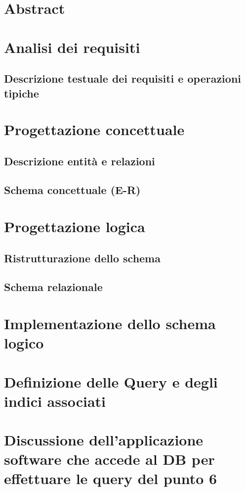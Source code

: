 \documentclass{article}
\begin{document}
\section{Abstract}
\section{Analisi dei requisiti}
\subsection{Descrizione testuale dei requisiti e operazioni tipiche}
\section{Progettazione concettuale}
\subsection{Descrizione entità e relazioni}
\subsection{Schema concettuale (E-R)}
\section{Progettazione logica}
\subsection{Ristrutturazione dello schema}
\subsection{Schema relazionale}
\section{Implementazione dello schema logico}
\section{Definizione delle Query e degli indici associati}
\section{Discussione dell’applicazione software che accede al DB per effettuare le
query del punto 6}

\printindex
\end{document}

